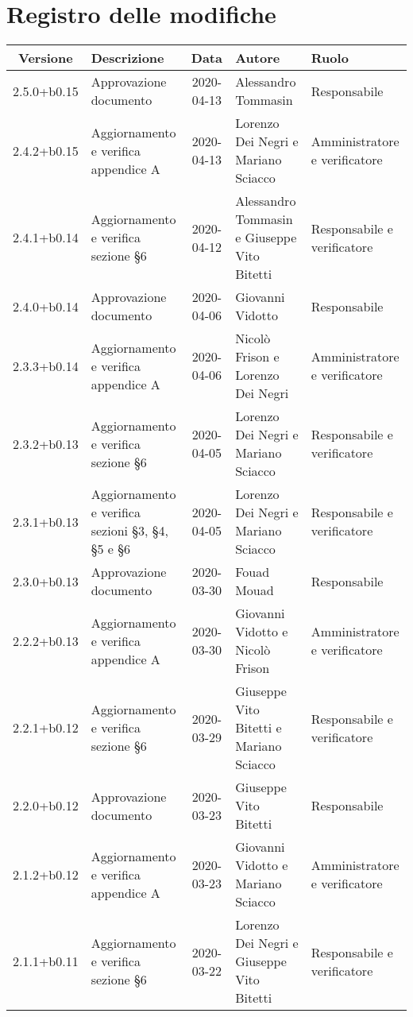 \section*{Registro delle modifiche}

\begin{center}
	\begin{longtable}{|c|p{3.5cm}|c|p{3cm}|p{3cm}|}
	\hline
	\rowcolor{lighter-grayer}
	\textbf{Versione} & \textbf{Descrizione} & \textbf{Data} & \textbf{Autore} & \textbf{Ruolo} \\
	\hline
	\endfirsthead

	2.5.0+b0.15 & Approvazione documento & 2020-04-13 & Alessandro Tommasin & Responsabile \\
	\hline
	2.4.2+b0.15 & Aggiornamento e verifica appendice A & 2020-04-13 & Lorenzo Dei Negri e Mariano Sciacco & Amministratore e verificatore \\
	\hline
	2.4.1+b0.14 & Aggiornamento e verifica sezione \S6 & 2020-04-12 & Alessandro Tommasin e Giuseppe Vito Bitetti & Responsabile e verificatore \\
	\hline
	
	2.4.0+b0.14 & Approvazione documento & 2020-04-06 & Giovanni Vidotto & Responsabile \\
	\hline
	2.3.3+b0.14 & Aggiornamento e verifica appendice A & 2020-04-06 & Nicolò Frison e Lorenzo Dei Negri & Amministratore e verificatore \\
	\hline
	2.3.2+b0.13 & Aggiornamento e verifica sezione \S6 & 2020-04-05 & Lorenzo Dei Negri e Mariano Sciacco & Responsabile e verificatore \\
	\hline
	2.3.1+b0.13 & Aggiornamento e verifica sezioni \S3, \S4, \S5 e \S6 & 2020-04-05 & Lorenzo Dei Negri e Mariano Sciacco & Responsabile e verificatore \\
	\hline
	
	2.3.0+b0.13 & Approvazione documento & 2020-03-30 & Fouad Mouad & Responsabile \\
	\hline
	2.2.2+b0.13 & Aggiornamento e verifica appendice A & 2020-03-30 & Giovanni Vidotto e Nicolò Frison & Amministratore e verificatore \\
	\hline
	2.2.1+b0.12 & Aggiornamento e verifica sezione \S6 & 2020-03-29 & Giuseppe Vito Bitetti e Mariano Sciacco & Responsabile e verificatore \\
	\hline
	
	2.2.0+b0.12 & Approvazione documento & 2020-03-23 & Giuseppe Vito Bitetti & Responsabile \\
	\hline
	2.1.2+b0.12 & Aggiornamento e verifica appendice A & 2020-03-23 & Giovanni Vidotto e Mariano Sciacco & Amministratore e verificatore \\
	\hline
	2.1.1+b0.11 & Aggiornamento e verifica sezione \S6 & 2020-03-22 & Lorenzo Dei Negri e Giuseppe Vito Bitetti & Responsabile e verificatore \\
	\hline


\end{longtable}
\end{center}
